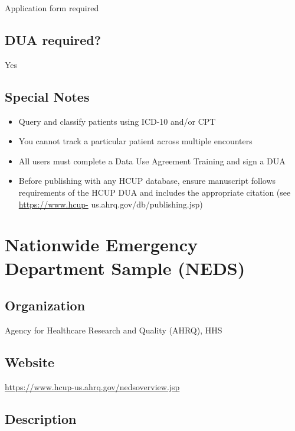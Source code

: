 \documentclass[
]{book}
\providecommand{\tightlist}{%
  \setlength{\itemsep}{0pt}\setlength{\parskip}{0pt}}
\begin{document}
Application form required

\hypertarget{dua-required-69}{%
\section{DUA required?}\label{dua-required-69}}

Yes

\hypertarget{special-notes-69}{%
\section{Special Notes}\label{special-notes-69}}

\begin{itemize}
\tightlist
\item
  Query and classify patients using ICD-10 and/or CPT
\item
  You cannot track a particular patient across multiple encounters
\item
  All users must complete a Data Use Agreement Training and sign a DUA
\item
  Before publishing with any HCUP database, ensure manuscript follows requirements of the HCUP DUA and includes the appropriate citation (see \url{https://www.hcup-} us.ahrq.gov/db/publishing.jsp)
\end{itemize}

\mainmatter

\hypertarget{nationwide-emergency-department-sample-neds}{%
\chapter{Nationwide Emergency Department Sample (NEDS)}\label{nationwide-emergency-department-sample-neds}}

\hypertarget{organization-70}{%
\section{Organization}\label{organization-70}}

Agency for Healthcare Research and Quality (AHRQ), HHS

\hypertarget{website-70}{%
\section{Website}\label{website-70}}

\url{https://www.hcup-us.ahrq.gov/nedsoverview.jsp}

\hypertarget{description-70}{%
\section{Description}\label{description-70}}
\end{document}
